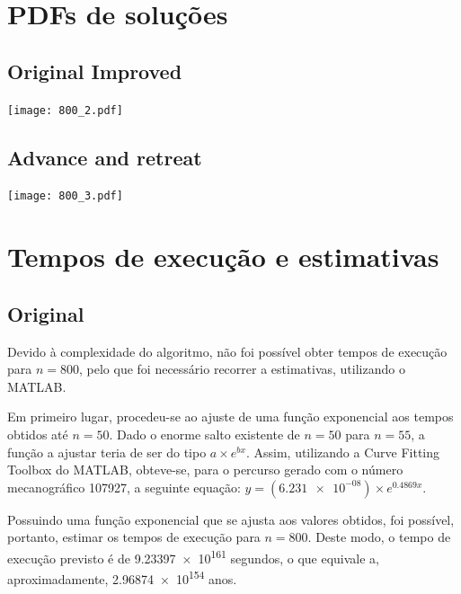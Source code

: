 \documentclass[portuguese,11pt,a4paper,titlepage]{article}
\begin{document}
\section{PDFs de soluções}
\subsection{Original Improved}
\texttt{[image: 800\_2.pdf]}
\subsection{Advance and retreat}
\texttt{[image: 800\_3.pdf]}
\pagebreak

\section{Tempos de execução e estimativas}
\subsection{Original}
Devido à complexidade do algoritmo, não foi possível obter tempos de execução para \begin{math}n = 800\end{math},
pelo que foi necessário recorrer a estimativas, utilizando o MATLAB.

Em primeiro lugar, procedeu-se ao ajuste de uma função exponencial aos tempos obtidos
até \begin{math}n = 50\end{math}.
Dado o enorme salto existente de \begin{math}n = 50\end{math} para \begin{math}n = 55\end{math},
a função a ajustar teria de ser do tipo \begin{math}a\times e^{bx}\end{math}.
Assim, utilizando a Curve Fitting Toolbox do MATLAB, obteve-se,
para o percurso gerado com o número mecanográfico 107927,
a seguinte equação: \begin{math}y = (\num{6.231e-08})\times e^{0.4869x}\end{math}.

Possuindo uma função exponencial que se ajusta aos valores obtidos, foi possível,
portanto, estimar os tempos de execução para \begin{math}n = 800\end{math}.
Deste modo, o tempo de execução previsto é de \num{9.23397e+161} segundos,
o que equivale a, aproximadamente, \num{2.96874e+154} anos.
\end{document}
